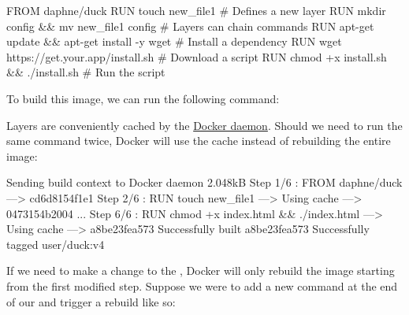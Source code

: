 \begin{dockerlisting}
FROM daphne/duck
RUN touch new_file1                            # Defines a new layer
RUN mkdir config && mv new_file1 config        # Layers can chain commands
RUN apt-get update && apt-get install -y wget  # Install a dependency
RUN wget https://get.your.app/install.sh       # Download a script
RUN chmod +x install.sh && ./install.sh        # Run the script
\end{dockerlisting}
%
To build this image, we can run the following command:

%
Layers are conveniently cached by the \href{https://docs.docker.com/engine/reference/commandline/dockerd/}{Docker daemon}. Should we need to run the same command twice, Docker will use the cache instead of rebuilding the entire image:

\begin{pclisting}
Sending build context to Docker daemon  2.048kB
Step 1/6 : FROM daphne/duck
---> cd6d8154f1e1
Step 2/6 : RUN touch new_file1
---> Using cache
---> 0473154b2004
...
Step 6/6 : RUN chmod +x index.html && ./index.html
---> Using cache
---> a8be23fea573
Successfully built a8be23fea573
Successfully tagged user/duck:v4
\end{pclisting}
%
If we need to make a change to the , Docker will only rebuild the image starting from the first modified step. Suppose we were to add a new  command at the end of our  and trigger a rebuild like so:

